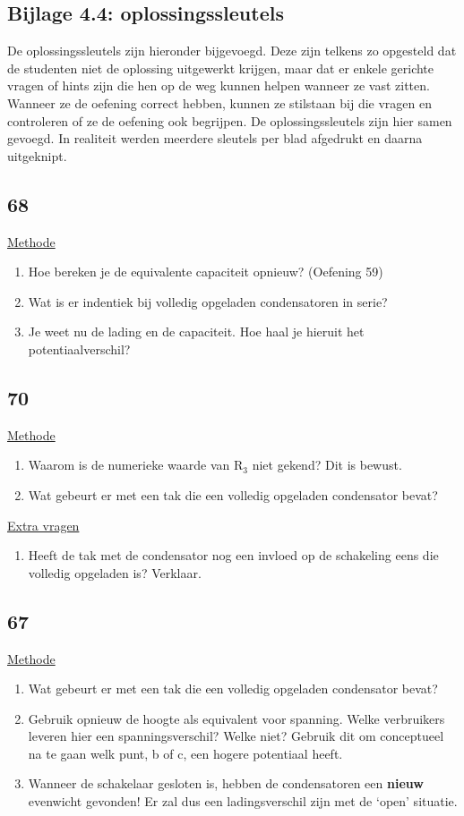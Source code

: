 \subsection*{Bijlage 4.4: oplossingssleutels}
De oplossingssleutels zijn hieronder bijgevoegd. Deze zijn telkens zo opgesteld dat de studenten niet de oplossing uitgewerkt krijgen, maar dat er enkele gerichte vragen of hints zijn die hen op de weg kunnen helpen wanneer ze vast zitten. Wanneer ze de oefening correct hebben, kunnen ze stilstaan bij die vragen en controleren of ze de oefening ook begrijpen.\newline
De oplossingssleutels zijn hier samen gevoegd. In realiteit werden meerdere sleutels per blad afgedrukt en daarna uitgeknipt.

\subsection*{68}
\underline{Methode}
\begin{enumerate}
\item Hoe bereken je de equivalente capaciteit opnieuw? (Oefening 59) 
\item Wat is er indentiek bij  volledig opgeladen condensatoren in serie?
\item Je weet nu de lading en de capaciteit. Hoe haal je hieruit het potentiaalverschil?
\end{enumerate}

\subsection*{70}
\underline{Methode}
\begin{enumerate}
\item Waarom is de numerieke waarde van R$_3$ niet gekend? Dit is bewust.
\item Wat gebeurt er met een tak die een volledig opgeladen condensator bevat?
\end{enumerate}

\underline{Extra vragen}
\begin{enumerate}
\item Heeft de tak met de condensator nog een invloed op de schakeling eens die volledig opgeladen is? Verklaar.
\end{enumerate}




\subsection*{67}
\underline{Methode}
\begin{enumerate}
	\item Wat gebeurt er met een tak die een volledig opgeladen condensator bevat?
	\item Gebruik opnieuw de hoogte als equivalent voor spanning. Welke verbruikers leveren hier een spanningsverschil? Welke niet? Gebruik dit om conceptueel na te gaan welk punt, b of c, een hogere potentiaal heeft.
	\item Wanneer de schakelaar gesloten is, hebben de condensatoren een \textbf{nieuw} evenwicht gevonden! Er zal dus een ladingsverschil zijn met de `open' situatie.
\end{enumerate}


